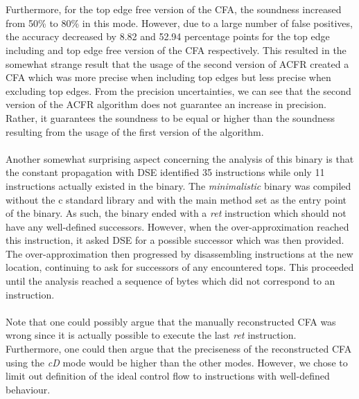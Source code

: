\documentclass{kththesis}
\renewcommand{\it}[1]{\textit{#1}}
\begin{document}
\\ \\
Furthermore, for the top edge free version of the CFA, the soundness increased from 50\% to 80\% in this mode. However, due to a large number of false positives, the accuracy decreased by 8.82 and 52.94 percentage points for the top edge including and top edge free version of the CFA respectively. This resulted in the somewhat strange result that the usage of the second version of ACFR created a CFA which was more precise when including top edges but less precise when excluding top edges. From the precision uncertainties, we can see that the second version of the ACFR algorithm does not guarantee an increase in precision. Rather, it guarantees the soundness to be equal or higher than the soundness resulting from the usage of the first version of the algorithm.
\\ \\
Another somewhat surprising aspect concerning the analysis of this binary is that the constant propagation with DSE identified 35 instructions while only 11 instructions actually existed in the binary. The \it{minimalistic} binary was compiled without the c standard library and with the main method set as the entry point of the binary. As such, the binary ended with a \it{ret} instruction which should not have any well-defined successors. However, when the over-approximation reached this instruction, it asked DSE for a possible successor which was then provided. The over-approximation then progressed by disassembling instructions at the new location, continuing to ask for successors of any encountered tops. This proceeded until the analysis reached a sequence of bytes which did not correspond to an instruction.
\\ \\
Note that one could possibly argue that the manually reconstructed CFA was wrong since it is actually possible to execute the last \it{ret} instruction. Furthermore, one could then argue that the preciseness of the reconstructed CFA using the \it{cD} mode would be higher than the other modes. However, we chose to limit out definition of the ideal control flow to instructions with well-defined behaviour. 
\end{document}

